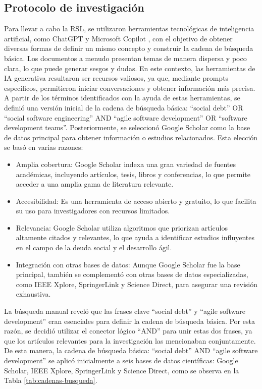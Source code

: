 \subsection{Protocolo de investigación}
Para llevar a cabo la RSL, se utilizaron herramientas tecnológicas de inteligencia artificial, como ChatGPT \cite{openai2022chatgpt} y Microsoft Copilot \cite{microsoft2023copilot}, con el objetivo de obtener diversas formas de definir un mismo concepto y construir la cadena de búsqueda básica. Los documentos a menudo presentan temas de manera dispersa y poco clara, lo que puede generar sesgos y dudas. En este contexto, las herramientas de IA generativa resultaron ser recursos valiosos, ya que, mediante prompts específicos, permitieron iniciar conversaciones y obtener información más precisa. A partir de los términos identificados con la ayuda de estas herramientas, se definió una versión inicial de la cadena de búsqueda básica: ``social debt'' OR ``social software engineering'' AND ``agile software development'' OR ``software development teams''.
Posteriormente, se seleccionó Google Scholar como la base de datos principal para obtener información o estudios relacionados. Esta elección se basó en varias razones:
\begin{itemize}
    \item Amplia cobertura: Google Scholar indexa una gran variedad de fuentes académicas, incluyendo artículos, tesis, libros y conferencias, lo que permite acceder a una amplia gama de literatura relevante.
    \item Accesibilidad: Es una herramienta de acceso abierto y gratuito, lo que facilita su uso para investigadores con recursos limitados.
    \item Relevancia: Google Scholar utiliza algoritmos que priorizan artículos altamente citados y relevantes, lo que ayuda a identificar estudios influyentes en el campo de la deuda social y el desarrollo ágil.
    \item Integración con otras bases de datos: Aunque Google Scholar fue la base principal, también se complementó con otras bases de datos especializadas, como IEEE Xplore, SpringerLink y Science Direct, para asegurar una revisión exhaustiva.
\end{itemize}
La búsqueda manual reveló que las frases clave ``social debt'' y ``agile software development'' eran esenciales para definir la cadena de búsqueda básica. Por esta razón, se decidió utilizar el conector lógico ``AND'' para unir estas dos frases, ya que los artículos relevantes para la investigación las mencionaban conjuntamente. De esta manera, la cadena de búsqueda básica: ``social debt'' AND ``agile software development'' se aplicó inicialmente a seis bases de datos científicas: Google Scholar, IEEE Xplore, SpringerLink y Science Direct, como se observa en la Tabla \ref{tab:cadenas-busqueda}.

